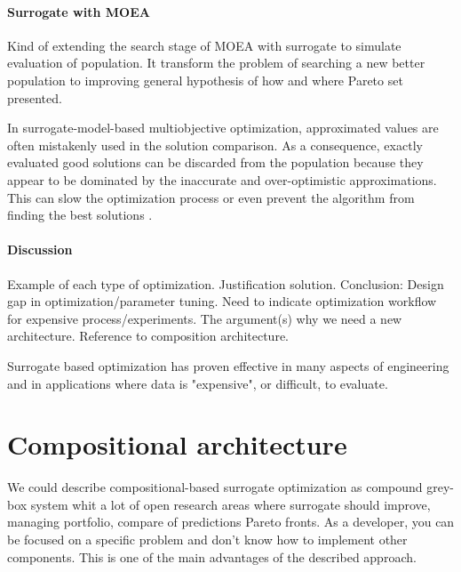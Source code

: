         \paragraph{Surrogate with MOEA}
        Kind of extending the search stage of MOEA with surrogate to simulate evaluation of population. It transform the problem of searching a new better population to improving general hypothesis of how and where Pareto set presented.  

        In surrogate-model-based multiobjective optimization, approximated values are often mistakenly used in the solution comparison. As a consequence, exactly evaluated good solutions can be discarded from the population because they appear to be dominated by the inaccurate and over-optimistic approximations. This can slow the optimization process or even prevent the algorithm from finding the best solutions \cite{MlakarPTF15}.       


        \paragraph{Discussion}
        Example of each type of optimization. Justification solution.
        Conclusion: Design gap in optimization/parameter tuning. 
        Need to indicate optimization workflow for expensive process/experiments. 
        The argument(s) why we need a new architecture. Reference to composition architecture.

        Surrogate based optimization has proven effective in many aspects of engineering and in applications where data is "expensive", or difficult, to evaluate.

    \section{Compositional architecture}

        We could describe compositional-based surrogate optimization as compound grey-box system whit a lot of open research areas where surrogate should improve, managing portfolio, compare of predictions Pareto fronts. 
        As a developer, you can be focused on a specific problem and don't know how to implement other components. This is one of the main advantages of the described approach.

